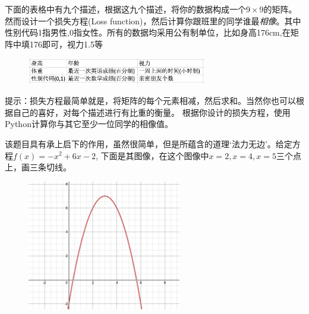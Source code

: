 \documentclass[12pt]{article}
\newenvironment{fullmodel}{
			\smallskip\noindent
			\begin{minipage}{\textwidth+\marginparwidth+\marginparsep}\smallskip\smallskip}
			{\smallskip\smallskip\end{minipage}\vspace{.1in}
			}
\numberwithin{equation}{section}
\numberwithin{figure}{section}
\newenvironment{question}[2][Question]{\begin{trivlist}
\item[\hskip \labelsep {\bfseries #1}\hskip \labelsep {\bfseries #2.}]}{\end{trivlist}}
\begin{document}
\begin{fullmodel}
\begin{question}{思考题C3-Q1}
\begin{figure}[H]
\begin{subfigure}[b]{0.45\textwidth}
		\end{subfigure}
	\end{figure}
\end{question}	
\end{fullmodel}


\begin{fullmodel}
\begin{question}{设计题 C3-Q2}
	下面的表格中有九个描述，根据这九个描述，将你的数据构成一个$9 \times 9$的矩阵。然而设计一个损失方程(Loss function)，然后计算你跟班里的同学谁最\textit{相像}。其中性别代码1指男性,0指女性。所有的数据均采用公有制单位，比如身高176cm,在矩阵中填176即可，视力1.5等
	\begin{figure}[H]
		\centering
		\includegraphics[width=0.7\textwidth]{fig/c3q2}
	\end{figure}
\end{question}
\noindent
提示：损失方程最简单就是，将矩阵的每个元素相减，然后求和。当然你也可以根据自己的喜好，对每个描述进行有比重的衡量。	根据你设计的损失方程，使用Python计算你与其它至少一位同学的相像值。
\end{fullmodel}


\begin{question}{作图题 C3-Q3}
	该题目具有承上启下的作用，虽然很简单，但是所蕴含的道理`法力无边'。给定方程$f(x) = -x^2+ 6x-2$, 下面是其图像，在这个图像中$x=2, x = 4, x =5$三个点上，画三条切线。
	\begin{figure}[H]
		\centering
		\includegraphics[width=0.6\textwidth]{fig/c3q3}
	\end{figure}
\end{question}
\end{document}
